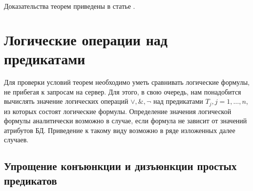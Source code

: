 \documentclass{cmi}
\begin{document}
Доказательства теорем приведены в статье \cite{mosin_zykin}.

\section{Логические операции над предикатами}
\label{sec-logicak_operations}
Для проверки условий теорем необходимо уметь сравнивать логические формулы, не прибегая к запросам
на сервер. Для этого, в свою очередь, нам понадобится вычислять значение логических операций $\vee,
\&, \neg$ над предикатами $T_j, j=1, \dots, n$, из которых состоят логические формулы. Определение значения логической формулы аналитически возможно в случае, если формула не зависит от значений атрибутов БД. Приведение к такому виду возможно в ряде изложенных далее случаев.

\subsection{Упрощение конъюнкции и дизъюнкции простых предикатов}
\end{document}
